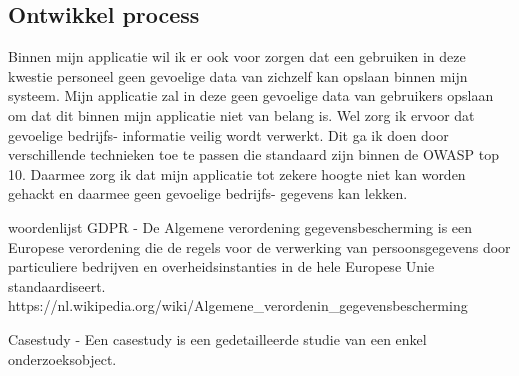 \subsection{Ontwikkel process}
Binnen mijn applicatie wil ik er ook voor zorgen dat een gebruiken in deze kwestie personeel geen gevoelige data van zichzelf kan opslaan binnen mijn systeem.
Mijn applicatie zal in deze geen gevoelige data van gebruikers opslaan om dat dit binnen mijn applicatie niet van belang is.
Wel zorg ik ervoor dat gevoelige bedrijfs- informatie veilig wordt verwerkt.
Dit ga ik doen door verschillende technieken toe te passen die standaard zijn binnen de OWASP top 10.
Daarmee zorg ik dat mijn applicatie tot zekere hoogte niet kan worden gehackt en daarmee geen gevoelige bedrijfs- gegevens kan lekken.



\newpage
\bigskip
\bigskip
woordenlijst
GDPR - De Algemene verordening gegevensbescherming is een Europese verordening die de regels voor de verwerking van
persoonsgegevens door particuliere bedrijven en overheidsinstanties in de hele Europese Unie standaardiseert.
https://nl.wikipedia.org/wiki/Algemene\_verordenin\_gegevensbescherming

Casestudy -  Een casestudy is een gedetailleerde studie van een enkel onderzoeksobject.

